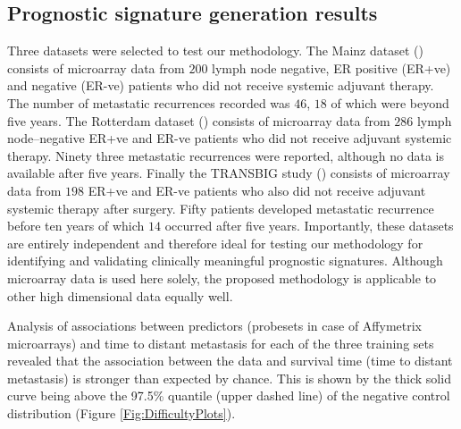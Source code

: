 \documentclass[letterpaper,12pt]{article}
\begin{document}
\subsection{Prognostic signature generation results}
Three datasets were selected to test our methodology. The Mainz dataset (\citet{Schmidt:08}) consists of microarray data from $200$ lymph node negative, ER positive (ER+ve) and negative (ER-ve) patients who did not receive systemic adjuvant therapy. The number of metastatic recurrences recorded was $46$, $18$ of which were beyond five years. The Rotterdam dataset (\citet{Wang:05}) consists of microarray data from $286$ lymph node–negative ER+ve and ER-ve patients who did not receive adjuvant systemic therapy. Ninety three metastatic recurrences were reported, although no data is available after five years. Finally the TRANSBIG study (\citet{Desmedt:07}) consists of microarray data from $198$ ER+ve and ER-ve patients who also did not receive adjuvant systemic therapy after surgery. Fifty patients developed metastatic recurrence before ten years of which $14$ occurred after five years. Importantly, these datasets are entirely independent and therefore ideal for testing our methodology for identifying and validating clinically meaningful prognostic signatures. Although microarray data is used here solely, the proposed methodology is applicable to other high dimensional data equally well.

Analysis of associations between predictors (probesets in case of Affymetrix microarrays) and time to distant metastasis for each of the three training sets revealed that the association between the data and survival time (time to distant metastasis) is stronger than expected by chance. This is shown by the thick solid curve being above the 97.5\% quantile (upper dashed line) of the negative control distribution (Figure \ref{Fig:DifficultyPlots}).
\end{document}
